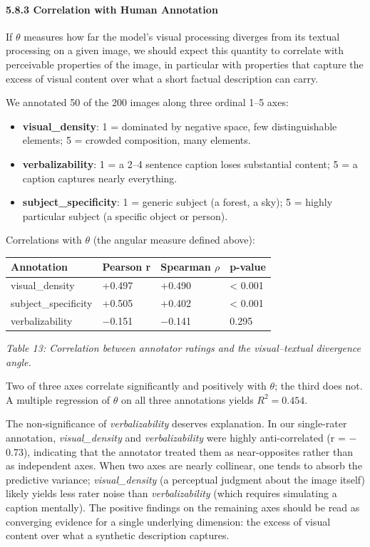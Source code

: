 \documentclass[11pt,a4paper]{article}
\begin{document}
\paragraph{5.8.3 Correlation with Human Annotation}

If $\theta$ measures how far the model's visual processing diverges from its textual processing on a given image, we should expect this quantity to correlate with perceivable properties of the image, in particular with properties that capture the excess of visual content over what a short factual description can carry.

We annotated 50 of the 200 images along three ordinal 1--5 axes:

\begin{itemize}[leftmargin=*]
  \item \textbf{visual\_density}: 1 = dominated by negative space, few distinguishable elements; 5 = crowded composition, many elements.
  \item \textbf{verbalizability}: 1 = a 2--4 sentence caption loses substantial content; 5 = a caption captures nearly everything.
  \item \textbf{subject\_specificity}: 1 = generic subject (a forest, a sky); 5 = highly particular subject (a specific object or person).
\end{itemize}

Correlations with $\theta$ (the angular measure defined above):

\begin{center}
\begin{tabular}{llll}
\toprule
Annotation & Pearson r & Spearman \ensuremath{\rho} & p-value \\
\midrule
visual\_density & +0.497 & +0.490 & < 0.001 \\
subject\_specificity & +0.505 & +0.402 & < 0.001 \\
verbalizability & \ensuremath{-}0.151 & \ensuremath{-}0.141 & 0.295 \\
\bottomrule
\end{tabular}
\end{center}

\emph{Table 13: Correlation between annotator ratings and the visual--textual divergence angle.}

Two of three axes correlate significantly and positively with $\theta$; the third does not. A multiple regression of $\theta$ on all three annotations yields $R^2 = 0.454$.

The non-significance of \emph{verbalizability} deserves explanation. In our single-rater annotation, \emph{visual\_density} and \emph{verbalizability} were highly anti-correlated (r = \ensuremath{-}0.73), indicating that the annotator treated them as near-opposites rather than as independent axes. When two axes are nearly collinear, one tends to absorb the predictive variance; \emph{visual\_density} (a perceptual judgment about the image itself) likely yields less rater noise than \emph{verbalizability} (which requires simulating a caption mentally). The positive findings on the remaining axes should be read as converging evidence for a single underlying dimension: the excess of visual content over what a synthetic description captures.
\end{document}
